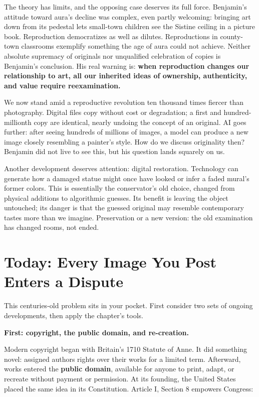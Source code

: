 The theory has limits, and the opposing case deserves its full force. Benjamin's attitude toward aura's decline was complex, even partly welcoming: bringing art down from its pedestal lets small-town children see the Sistine ceiling in a picture book. Reproduction democratizes as well as dilutes. Reproductions in county-town classrooms exemplify something the age of aura could not achieve. Neither absolute supremacy of originals nor unqualified celebration of copies is Benjamin's conclusion. His real warning is: \textbf{when reproduction changes our relationship to art, all our inherited ideas of ownership, authenticity, and value require reexamination.}

We now stand amid a reproductive revolution ten thousand times fiercer than photography. Digital files copy without cost or degradation; a first and hundred-millionth copy are identical, nearly undoing the concept of an original. AI goes further: after seeing hundreds of millions of images, a model can produce a new image closely resembling a painter's style. How do we discuss originality then? Benjamin did not live to see this, but his question lands squarely on us.

Another development deserves attention: digital restoration. Technology can generate how a damaged statue might once have looked or infer a faded mural's former colors. This is essentially the conservator's old choice, changed from physical additions to algorithmic guesses. Its benefit is leaving the object untouched; its danger is that the guessed original may resemble contemporary tastes more than we imagine. Preservation or a new version: the old examination has changed rooms, not ended.

\section{Today: Every Image You Post Enters a Dispute}
This centuries-old problem sits in your pocket. First consider two sets of ongoing developments, then apply the chapter's tools.

\textbf{First: copyright, the public domain, and re-creation.}

Modern copyright began with Britain's 1710 Statute of Anne. It did something novel: assigned authors rights over their works for a limited term. Afterward, works entered the \textbf{public domain}, available for anyone to print, adapt, or recreate without payment or permission. At its founding, the United States placed the same idea in its Constitution. Article I, Section 8 empowers Congress:


